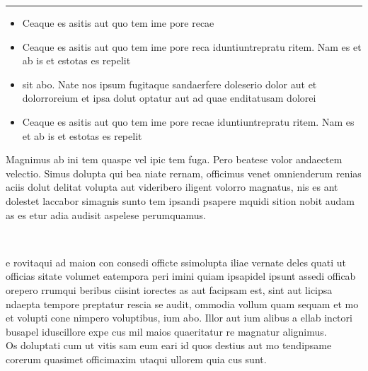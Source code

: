 \documentclass{beamer}
\begin{document}
\begin{frame}[t]
  \begin{appendixblock}
    \begin{minipage}[c]{.48\linewidth}
      \centering
      \color{fzjblue}\rule{0.9\linewidth}{0.2\paperheight}
    \end{minipage}
    \hfill
    \begin{minipage}[c]{.48\linewidth}
      \begin{itemize}
        \item Ceaque es asitis aut quo tem ime pore recae
        \item Ceaque es asitis aut quo tem ime pore reca
        iduntiuntrepratu ritem. Nam es et ab is et estotas es repelit
        \item sit abo. Nate nos ipsum fugitaque sandaerfere doleserio
        dolor aut et dolorroreium et ipsa dolut optatur aut ad quae
        enditatusam dolorei
        \item Ceaque es asitis aut quo tem ime pore recae
        iduntiuntrepratu ritem. Nam es et ab is et estotas es repelit
      \end{itemize}
    \end{minipage}
  \end{appendixblock}

  Magnimus ab ini tem quaspe vel ipic tem fuga. Pero beatese volor
  andaectem velectio. Simus dolupta qui bea niate rernam, officimus
  venet omnienderum renias aciis dolut delitat volupta aut videribero
  iligent volorro magnatus, nis es ant dolestet laccabor simagnis
  sunto tem ipsandi psapere mquidi sition nobit audam as es etur adia
  audisit aspelese perumquamus.\\[1.5ex]

  \begin{columns}[onlytextwidth]
    \begin{column}{.49\linewidth}
      \textbf{}\\
      e rovitaqui ad maion con consedi officte ssimolupta iliae
      vernate deles quati ut officias sitate volumet eatempora peri
      imini quiam ipsapidel ipsunt assedi officab orepero rrumqui
      beribus ciisint iorectes as aut facipsam est, sint aut licipsa
      ndaepta tempore preptatur rescia se audit, ommodia vollum quam
      sequam et mo et volupti cone nimpero voluptibus, ium abo. Illor
      aut ium alibus a ellab inctori busapel iduscillore expe cus mil
      maios quaeritatur re magnatur alignimus.\\[1ex]

      Os doluptati cum ut vitis sam eum eari id quos destius aut mo
      tendipsame corerum quasimet officimaxim utaqui ullorem quia cus
      sunt.\\[1ex]


\end{column}
\end{columns}
\end{frame}
\end{document}
